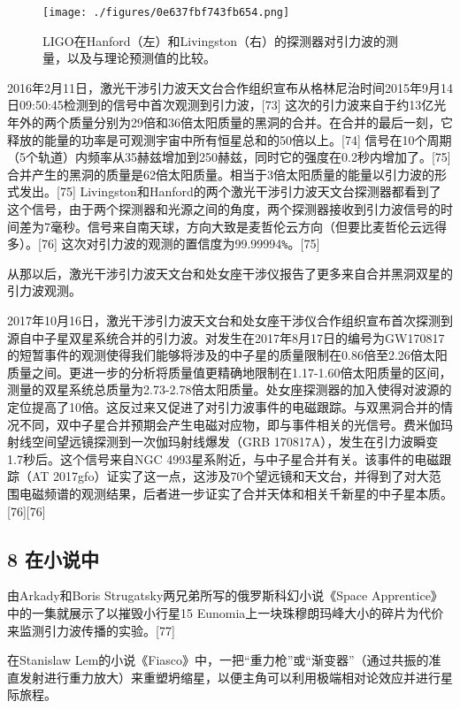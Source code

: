 \begin{figure}[ht]
\centering
\texttt{[image: ./figures/0e637fbf743fb654.png]}
\caption{LIGO在Hanford（左）和Livingston（右）的探测器对引力波的测量，以及与理论预测值的比较。} \label{fig_YLB_12}
\end{figure}

2016年2月11日，激光干涉引力波天文台合作组织宣布从格林尼治时间2015年9月14日09:50:45检测到的信号中首次观测到引力波，[73] 这次的引力波来自于约13亿光年外的两个质量分别为29倍和36倍太阳质量的黑洞的合并。在合并的最后一刻，它释放的能量的功率是可观测宇宙中所有恒星总和的50倍以上。[74] 信号在10个周期（5个轨道）内频率从35赫兹增加到250赫兹，同时它的强度在0.2秒内增加了。[75] 合并产生的黑洞的质量是62倍太阳质量。相当于3倍太阳质量的能量以引力波的形式发出。[75] Livingston和Hanford的两个激光干涉引力波天文台探测器都看到了这个信号，由于两个探测器和光源之间的角度，两个探测器接收到引力波信号的时间差为7毫秒。信号来自南天球，方向大致是麦哲伦云方向（但要比麦哲伦云远得多）。[76] 这次对引力波的观测的置信度为99.99994\verb`%`。[75]

从那以后，激光干涉引力波天文台和处女座干涉仪报告了更多来自合并黑洞双星的引力波观测。

2017年10月16日，激光干涉引力波天文台和处女座干涉仪合作组织宣布首次探测到源自中子星双星系统合并的引力波。对发生在2017年8月17日的编号为GW170817的短暂事件的观测使得我们能够将涉及的中子星的质量限制在0.86倍至2.26倍太阳质量之间。更进一步的分析将质量值更精确地限制在1.17-1.60倍太阳质量的区间，测量的双星系统总质量为2.73-2.78倍太阳质量。处女座探测器的加入使得对波源的定位提高了10倍。这反过来又促进了对引力波事件的电磁跟踪。与双黑洞合并的情况不同，双中子星合并预期会产生电磁对应物，即与事件相关的光信号。费米伽玛射线空间望远镜探测到一次伽玛射线爆发（GRB 170817A），发生在引力波瞬变1.7秒后。这个信号来自NGC 4993星系附近，与中子星合并有关。该事件的电磁跟踪（AT 2017gfo）证实了这一点，这涉及70个望远镜和天文台，并得到了对大范围电磁频谱的观测结果，后者进一步证实了合并天体和相关千新星的中子星本质。[76][76]

\subsection{8 在小说中}

由Arkady和Boris Strugatsky两兄弟所写的俄罗斯科幻小说《Space Apprentice》中的一集就展示了以摧毁小行星15 Eunomia上一块珠穆朗玛峰大小的碎片为代价来监测引力波传播的实验。[77]

在Stanislaw Lem的小说《Fiasco》中，一把“重力枪”或“渐变器”（通过共振的准直发射进行重力放大）来重塑坍缩星，以便主角可以利用极端相对论效应并进行星际旅程。

